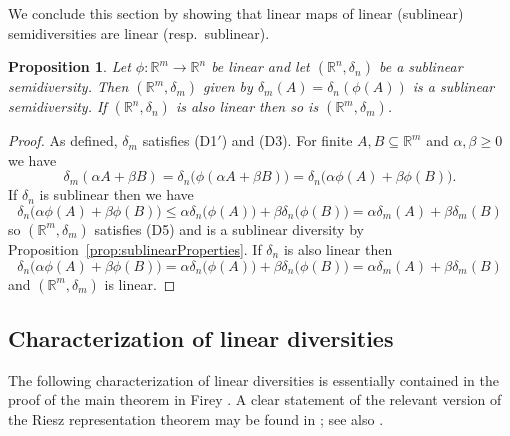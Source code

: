 \documentclass[11pt]{article}
\newtheorem{proposition}[theorem]{Proposition}
\renewcommand{\Re}{\mathbb{R}}
\begin{document}
We conclude this section by showing that linear maps of linear (sublinear) semidiversities are linear (resp.~sublinear). 

\begin{proposition} \label{prop:linearMap}
    Let $\phi:\Re^m \rightarrow \Re^n$ be linear and let $(\Re^n,\delta_n)$ be a sublinear semidiversity. Then $(\Re^m,\delta_m)$ given by $\delta_m(A) = \delta_n(\phi(A))$ is a sublinear semidiversity. If $(\Re^n,\delta_n)$ is also linear then so is $(\Re^m,\delta_m)$.
\end{proposition}
\begin{proof}
    As defined, $\delta_m$ satisfies (D1$'$) and (D3). For finite $A,B \subseteq \Re^m$ and $\alpha,\beta \geq 0$ we have
    \[\delta_m(\alpha A + \beta B) = \delta_n\big(\phi(\alpha A + \beta B)\big) = \delta_n\big(\alpha \phi(A) + \beta \phi(B)\big).\]
    If $\delta_n$ is sublinear then we have
    \[\delta_n\big(\alpha \phi(A) + \beta \phi(B)\big) \leq \alpha \delta_n\big(\phi(A)\big) + \beta \delta_n\big(\phi(B)\big) = \alpha \delta_m(A) + \beta \delta_m(B) \]
so $(\Re^m,\delta_m)$ satisfies (D5) and is a sublinear diversity by Proposition~\ref{prop:sublinearProperties}. If $\delta_n$ is also linear then
 \[\delta_n\big(\alpha \phi(A) + \beta \phi(B)\big) = \alpha \delta_n\big(\phi(A)\big) + \beta \delta_n\big(\phi(B)\big) = \alpha \delta_m(A) + \beta \delta_m(B) \]
   and $(\Re^m,\delta_m)$ is linear.
\end{proof}



\subsection{Characterization of linear diversities} \label{subsec:linear_characterization}



The following characterization of linear diversities is essentially contained in the proof of the main theorem in Firey \cite{firey1976functional}. A clear statement of the relevant version of the Riesz representation theorem  may be found in \cite{rotem2021riesz}; see also \cite{meyer1995convex,hug2020lectures}.
\end{document}
